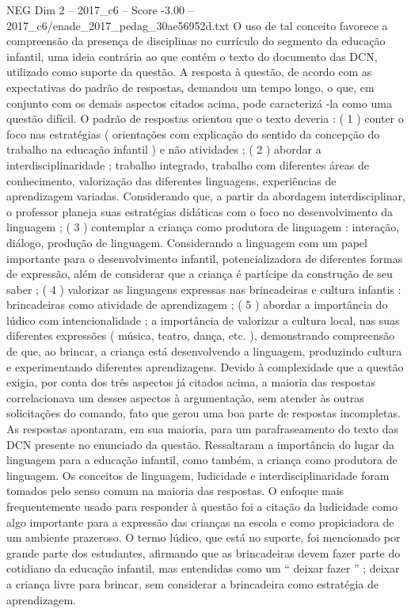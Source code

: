 \begin{textsample}{NEG Dim 2 – 2017\_c6 – Score -3.00 – 2017\_c6/enade\_2017\_pedag\_30ae56952d.txt}
O uso de tal conceito favorece a compreensão da presença de disciplinas no currículo do segmento da educação infantil, uma ideia contrária ao que contém o texto do documento das DCN, utilizado como suporte da questão.
A resposta à questão, de acordo com as expectativas do padrão de respostas, demandou um tempo longo, o que, em conjunto com os demais aspectos citados acima, pode caracterizá -la como uma questão difícil.
O padrão de respostas orientou que o texto deveria : ( 1 ) conter o foco nas estratégias ( orientações com explicação do sentido da concepção do trabalho na educação infantil ) e não atividades ; ( 2 ) abordar a interdisciplinaridade ; trabalho integrado, trabalho com diferentes áreas de conhecimento, valorização das diferentes linguagens, experiências de aprendizagem variadas.
Considerando que, a partir da abordagem interdisciplinar, o professor planeja suas estratégias didáticas com o foco no desenvolvimento da linguagem ; ( 3 ) contemplar a criança como produtora de linguagem : interação, diálogo, produção de linguagem.
Considerando a linguagem com um papel importante para o desenvolvimento infantil, potencializadora de diferentes formas de expressão, além de considerar que a criança é partícipe da construção de seu saber ; ( 4 ) valorizar as linguagens expressas nas brincadeiras e cultura infantis : brincadeiras como atividade de aprendizagem ; ( 5 ) abordar a importância do lúdico com intencionalidade ; a importância de valorizar a cultura local, nas suas diferentes expressões ( música, teatro, dança, etc. ), demonstrando compreensão de que, ao brincar, a criança está desenvolvendo a linguagem, produzindo cultura e experimentando diferentes aprendizagens.
Devido à complexidade que a questão exigia, por conta dos três aspectos já citados acima, a maioria das respostas correlacionava um desses aspectos à argumentação, sem atender às outras solicitações do comando, fato que gerou uma boa parte de respostas incompletas.
As respostas apontaram, em sua maioria, para um parafraseamento do texto das DCN presente no enunciado da questão.
Ressaltaram a importância do lugar da linguagem para a educação infantil, como também, a criança como produtora de linguagem.
Os conceitos de linguagem, ludicidade e interdisciplinaridade foram tomados pelo senso comum na maioria das respostas.
O enfoque mais frequentemente usado para responder à questão foi a citação da ludicidade como algo importante para a expressão das crianças na escola e como propiciadora de um ambiente prazeroso.
O termo lúdico, que está no suporte, foi mencionado por grande parte dos estudantes, afirmando que as brincadeiras devem fazer parte do cotidiano da educação infantil, mas entendidas como um “ deixar fazer ” ; deixar a criança livre para brincar, sem considerar a brincadeira como estratégia de aprendizagem.

\end{textsample}
